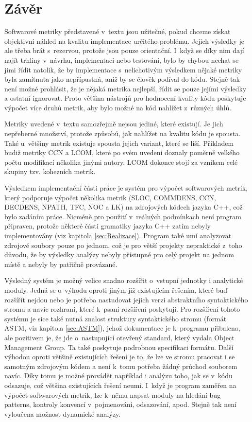 \documentclass[11pt,twoside,a4paper]{book}
\begin{document}
\chapter{Závěr}

Softwarové metriky představené v~textu jsou užitečné, pokud chceme získat objektivní náhled na kvalitu implementace určitého problému.
Jejich výsledky je ale třeba brát s~rezervou, protože jsou pouze orientační. I~když se díky nim dají najít trhliny v~návrhu,
implementaci nebo testování, bylo by chybou nechat se jimi řídit natolik, že by implementace s~nelichotivým výsledkem nějaké metriky
byla zamítnuta jako nepřípustná, aniž by se člověk podíval do kódu. Stejně tak není možné prohlásit, že je nějaká metrika nejlepší,
řídit se pouze jejími výsledky a ostatní ignorovat. Proto většina nástrojů pro hodnocení kvality kódu poskytuje výpočet více
druhů metrik, aby bylo možné na kód nahlížet z~různých úhlů.

Metriky uvedené v~textu samozřejmě nejsou jediné, které existují. Je jich nepřeberné množství, protože způsobů,
jak nahlížet na kvalitu kódu je spousta. Také u~většiny metrik existuje spousta jejich variant, které se liší. Příkladem budiž
metriky CCN a LCOM, které po svém uvedení doznaly poměrně velkého počtu modifikací několika jinými autory. LCOM
dokonce stojí za vznikem celé skupiny tzv. kohezních metrik.

Výsledkem implementační části práce je systém pro výpočet softwarových metrik, který podporuje výpočet několika metrik
(SLOC, COMMDENS, CCN, DECDENS, NPATH, TFC, NOC a LK) na zdrojových kódech jazyka C++, což bylo zadáním práce. Nicméně pro použití v~reálných
podmínkach není program připraven, protože některé části gramatiky jazyka C++ zatím nebyly implementovány (viz kapitola \ref{sec:Realizace}).
Program také umí analyzovat zdrojové soubory pouze po jednom, což je pro větší projekty nepraktické z~toho důvodu, že by výsledky
analýzy nebyly přístupné pro celý projekt na jednom místě a nebyly by patřičně provázané.

Výsledný systém je možný velice snadno rozšířit o~vstupní jednotky i analytické moduly. Jedná se o~výhodu oproti jiným již existujícím řešením,
které buď rozšířít nejdou nebo je potřeba nastudovat jejich verzi abstraktního syntaktického stromu a navíc rozhraní, které k~psaní rozšíření
poskytují. Pro rozšíření tohoto systému je sice také nutná znalost struktury syntaktického stromu (formát ASTM, viz kapitola \ref{sec:ASTM}),
jehož dokumentace je k~programu přibalena, ale pozitivem je, že jde o~nastupující otevřený standard, který vydala Object Management Group.
Ta také poskytuje podrobnou specifikaci formátu. Další výhodou oproti většině existujících řešení je to, že lze ve stromu pracovat
i se samotným zdrojovým kódem a není k~tomu potřeba žádný průchod souborem navíc. Díky tomu je možné provádět například i analýzu toho,
jak se v~kódu odsazuje, což většina existujících řešení neumí. I~když je program zaměřen na výpočet softwarových metrik,
lze k~němu napsat moduly na hledání bug patterns, kontroly konvencí v~pojmenování, odsazování, apod. Stejně tak není vyloučena možnost dynamické analýzy.
\end{document}
